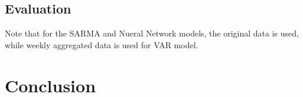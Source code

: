\documentclass{article}
\begin{document}
\hypertarget{evaluation-1}{%
\subsection{Evaluation}\label{evaluation-1}}

Note that for the SARMA and Nueral Network models, the original data is
used, while weekly aggregated data is used for VAR model.

\hypertarget{conclusion}{%
\section{Conclusion}\label{conclusion}}



\end{document}
